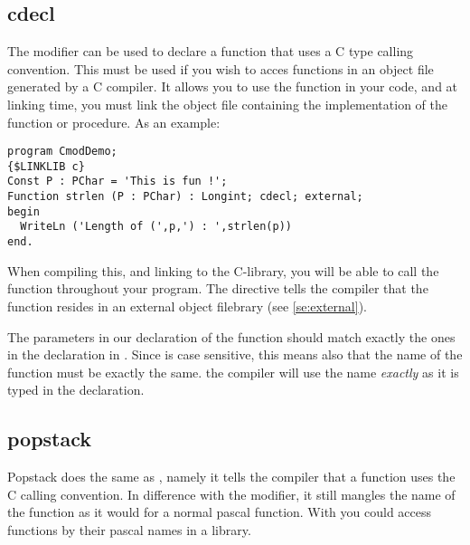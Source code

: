 \documentclass{report}
\begin{document}
\subsection{cdecl}
\label{se:cdecl}
The  modifier can be used to declare a function that uses a C
type calling convention. This must be used if you wish to acces functions in
an object file generated by a C compiler. It allows you to use the function in
your code, and at linking time, you must link the object file containing the
 implementation of the function or procedure.
As an example:
\begin{verbatim}
program CmodDemo;
{$LINKLIB c}
Const P : PChar = 'This is fun !';
Function strlen (P : PChar) : Longint; cdecl; external;
begin
  WriteLn ('Length of (',p,') : ',strlen(p))
end.
\end{verbatim}
When compiling this, and linking to the C-library, you will be able to call
the  function throughout your program. The 
directive tells the compiler that the function resides in an external
object filebrary (see \ref{se:external}).
\begin{remark} 
The parameters in our declaration of the  function should
match exactly the ones in the declaration in . Since  is case
sensitive, this means also that the name of the
function must be exactly the same. the \fpc compiler will use the name {\em
exactly} as it is typed in the declaration.
\end{remark}

\subsection{popstack}
\label{se:popstack}
Popstack does the same as , namely it tells the \fpc compiler
that a function uses the C calling convention. In difference with the
 modifier, it still mangles the name of the function as it would
for a normal pascal function.
With  you could access functions by their pascal names in a
library.
\end{document}
